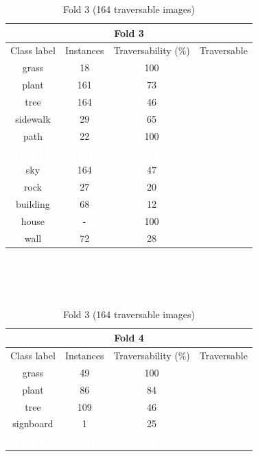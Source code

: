 \documentclass[12pt,a4paper,table,dvipsnames,tikz]{report}
\newcommand{\white}[1]{\textbf{\textcolor{white}{#1}}} %
\begin{document}
	\begin{table}[h!]
		\ContinuedFloat %
		\begin{subtable}[h!]{\textwidth}
			\centering
			\begin{tabular}{|c|c|c|c|}
				\hline
				\multicolumn{4}{|c|}{Fold 3}\\
				\hline
				Class label & Instances & Traversability (\%) & Traversable\\
				\hline\hline
				grass & 18 & 100 & \checkmark\\
				\hline
				plant & 161 & 73 & \checkmark\\
				\hline
				\rowcolor{tree}
				tree & 164 & 46 &\\
				\hline
				sidewalk & 29 & 65 & \checkmark\\
				\hline
				path & 22 & 100 & \checkmark\\
				\hline
				\rowcolor{earth}
				\white{earth} & \white{164} & \white{47} &\\
				\hline
				\rowcolor{sky}
				sky & 164 & 47 &\\
				\hline
				rock & 27 & 20 &\\
				\hline
				building & 68 & 12 &\\
				\hline
				\rowcolor{house}
				house & - & 100 & \checkmark\\
				\hline
				wall & 72 & 28 &\\
				\hline
			\end{tabular}
			\caption{Fold 3 (164 traversable images)}
			\label{table:trav.f3}
		\end{subtable}
		\\\\\\
		\begin{subtable}[h!]{\textwidth}
			\centering
			\begin{tabular}{|c|c|c|c|}
				\hline
				\multicolumn{4}{|c|}{Fold 4}\\
				\hline
				Class label & Instances & Traversability (\%) & Traversable\\
				\hline\hline
				grass & 49 & 100 & \checkmark\\
				\hline
				plant & 86 & 84 & \checkmark\\
				\hline
				\rowcolor{tree}
				tree & 109 & 46 &\\
				\hline
				signboard & 1 & 25 &\\
				\hline
				\rowcolor{earth}
				\white{earth} & \white{83} & \white{48} &\\

\end{tabular}
\end{subtable}
\end{table}
\end{document}
